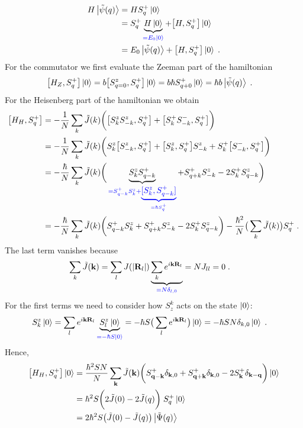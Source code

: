 %
\begin{align*}
H \ket{\tilde \psi(q)} &= H  S_{q}^{+} \ket{0} \\
&= S_{q}^{+} \underbrace{
H \ket{0}
}_{\color{blue} = E_{0}\ket{0}}+\big[H,  S_{q}^{+}\big] \ket{0}\\
&= E_{0} \ket{\tilde \psi(q)}  +\big[H,  S_{q}^{+}\big] \ket{0}\;.
\end{align*}
%
For the commutator we first evaluate the Zeeman part of the hamiltonian
%
\begin{align*}
\big[H_{Z},  S_{q}^{+}\big] \ket{0} &= b \big[S^{z}_{q=0},  S_{q}^{+}\big] \ket{0}= b \hbar S_{q+0}^{+}\ket{0} =
\hbar b \ket{\tilde \psi(q)}\;.
\end{align*}
%
For the Heisenberg part of the hamiltonian we obtain
%
\begin{align*}
\big[H_{H},  S_{q}^{+}\big]  &= -\frac{1}{N}\sum_{k} \tilde J(k)
\bigg(\big[S^{z}_{k}S^{z}_{-k},  S_{q}^{+}\big]
+
\big[S^{+}_{k}S^{-}_{-k},  S_{q}^{+}\big]\bigg)\\
&= -\frac{1}{N}\sum_{k} \tilde J(k)
\bigg(S^{z}_{k} \big[S^{z}_{-k},  S_{q}^{+}\big]
+
\big[S^{z}_{k},  S_{q}^{+}\big]S^{z}_{-k}
+
S^{+}_{k}\big[S^{-}_{-k},  S_{q}^{+}\big]\bigg)\\
&= -\frac{\hbar }{N}\sum_{k} \tilde J(k)
\bigg(\underbrace{
S^{z}_{k}  S_{q-k}^{+}
}_{\color{blue} = S_{q-k}^{+} S^{z}_{k}  + \underbrace{
[S^{z}_{k},  S_{q-k}^{+}]
}_{\color{blue} = \hbar S^{+}_{q}}}
+
 S_{q+k}^{+} S^{z}_{-k}
-2
S^{+}_{k}S^{z}_{q-k}\bigg)\\
&= -\frac{\hbar }{N}\sum_{k} \tilde J(k)
\bigg(
S_{q-k}^{+} S^{z}_{k}  
+
 S_{q+k}^{+} S^{z}_{-k}
-2
S^{+}_{k}S^{z}_{q-k}\bigg)
-\frac{\hbar^{2}}{N}\big(\sum_{k}\tilde J(k)\big) S^{+}_{q}\;.
\end{align*}
%
The last term vanishes because
%
\begin{align*}
\sum_{k}\tilde J(\mathbf k) &= \sum_{l} J(|\mathbf R_{l}|) \underbrace{
\sum_{k} e^{i \mathbf k\mathbf R_{l}}
}_{\color{blue} = N \delta_{l,0}} = N J_{ll} = 0\;.
\end{align*}
%
For the first terms we need to consider how $S_z^k$ acts on the state $\ket{0}$:
%
\begin{align*}
S^{z}_{k} \ket{0} &= \sum_{l} e^{i \mathbf k\mathbf R_{l}} \underbrace{
S_{l}^{z}\ket{0}
}_{\color{blue} = -\hbar S \ket{0}}
=-\hbar S\big( \sum_{l}e^{i \mathbf k\mathbf R_{l}}\big)\ket{0}
=-\hbar S N\delta_{k,0}\ket{0}\;.
\end{align*}
%
Hence,
\begin{align*}
\big[H_{H},  S_{q}^{+}\big] \ket{0} 
&=  \frac{\hbar^{2} S N}{N} \sum_{\mathbf k} \tilde J(\mathbf k)
\bigg(
S_{\mathbf q-\mathbf k}^{+} \delta_{\mathbf k,0}
+
 S_{\mathbf q+\mathbf k}^{+} \delta_{\mathbf k,0}
-2
S^{+}_{\mathbf k}\delta_{\mathbf k-\mathbf q}\bigg)\ket{0}\\
&= \hbar^{2} S  \bigg(2 \tilde J(0)
-2 \tilde J(q)
\bigg)\;S^{+}_{q}\ket{0}\\
&= 2 \hbar^{2}  S \big( \tilde J(0)-\tilde J(q) \big) \ket{\tilde \Psi(q) }
\end{align*}
